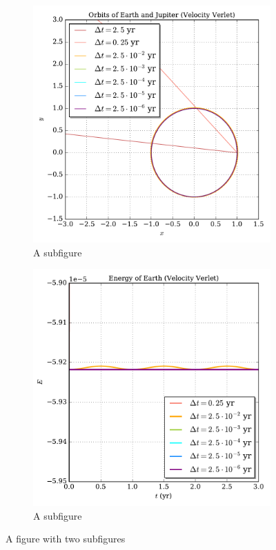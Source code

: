 \documentclass[prb,aps,twocolumn,showpacs,10pt]{revtex4-1}
\begin{document}
\newpage
\begin{figure}
\centering
\begin{subfigure}{.5\textwidth}
  \centering
  \includegraphics[width=\linewidth]{binary_fixed_vv_orbit.pdf}
  \caption{A subfigure}
  \label{fig:sub1}
\end{subfigure}%
\begin{subfigure}{.5\textwidth}
  \centering
  \includegraphics[width=\linewidth]{binary_fixed_vv_energy.pdf}
  \caption{A subfigure}
  \label{fig:sub2}
\end{subfigure}
\caption{A figure with two subfigures}
\label{fig:test}
\end{figure}
\end{document}
